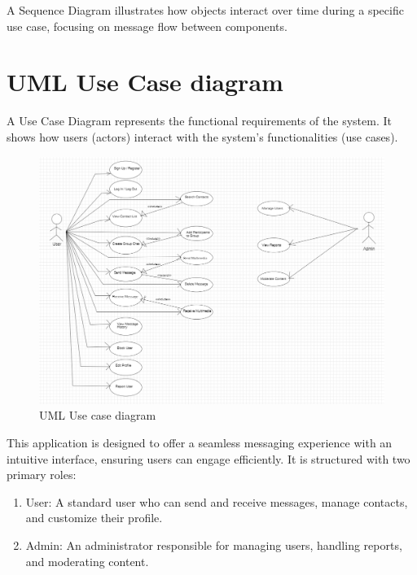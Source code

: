 A Sequence Diagram illustrates how objects interact over time during a specific use case, focusing on message flow between components.



\chapter{UML Use Case diagram}
\thispagestyle{pagestyle}
A Use Case Diagram represents the functional requirements of the system. It shows how users (actors) interact with the system’s functionalities (use cases).

\begin{figure}[h]
    \centering
    \includegraphics[width=1\textwidth]{images/use_case.png} %
    \caption{UML Use case diagram}
    \label{fig:example}
\end{figure}

This application is designed to offer a seamless messaging experience with an intuitive interface, ensuring users can engage efficiently. It is structured with two primary roles:
\begin{enumerate}
    \item User: A standard user who can send and receive messages, manage contacts, and customize their profile.
    \item Admin: An administrator responsible for managing users, handling reports, and moderating content.
\end{enumerate}

